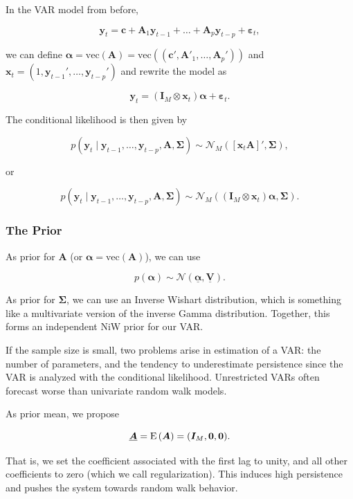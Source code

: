 In the VAR model from before, 

\[
	\bm{y}_t = \bm{c} + \bm{A}_1\bm{y}_{t-1} + \ldots + \bm{A}_p\bm{y}_{t-p} + \bm{\varepsilon}_t,
\]

we can define $\bm{\alpha} = \mathrm{vec}(\bm{A}) = \mathrm{vec}((\bm{c}',\bm{A}'_1,\dots,\bm{A}_p'))$ and $\bm{x}_t = (1,\bm{y}_{t-1}', \dots, \bm{y}_{t-p}')$ and rewrite the model as

\[
	\bm{y}_t = (\bm{I}_M\otimes \bm{x}_t)\bm{\alpha}+\bm{\varepsilon}_t.
\]

The conditional likelihood is then given by

\begin{equation}
	p(\bm{y}_t\mid\bm{y}_{t-1},\dots,\bm{y}_{t-p},\bm{A},\bm{\Sigma})\sim\mathcal{N}_M([\bm{x}_t\bm{A}]',\bm{\Sigma}),
\end{equation}

or

\[
	p(\bm{y}_t\mid\bm{y}_{t-1},\dots,\bm{y}_{t-p},\bm{A},\bm{\Sigma})\sim\mathcal{N}_M((\bm{I}_M\otimes \bm{x}_t)\bm{\alpha},\bm{\Sigma}).
\]

\subsubsection{The Prior}

As prior for $\bm{A}$ (or $\bm{\alpha} = \mathrm{vec}(\bm{A})$), we can use

\begin{equation}
	p(\bm{\alpha})\sim\mathcal{N}(\underline{\bm{\alpha}},\underline{\bm{V}}).
\end{equation}

As prior for $\bm{\Sigma}$, we can use an Inverse Wishart distribution, which is something like a multivariate version of the inverse Gamma distribution. Together, this forms an independent NiW prior for our VAR.

If the sample size is small, two problems arise in estimation of a VAR: the number of parameters, and the tendency to underestimate persistence since the VAR is analyzed with the conditional likelihood. Unrestricted VARs often forecast worse than univariate random walk models. 

As prior mean, we propose

\begin{equation}
	\underline{\bm{A}} = \mathrm{E}\left({\bm{A}}\right) = (\bm{I}_M,\bm{0},\bm{0}).
\end{equation}

That is, we set the coefficient associated with the first lag to unity, and all other coefficients to zero (which we call regularization). This induces high persistence and pushes the system towards random walk behavior.

